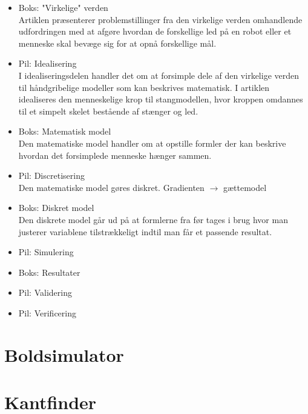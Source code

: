\documentclass{article}
\begin{document}
\begin{itemize}
	\item Boks: "Virkelige" verden \\
	Artiklen præsenterer problemstillinger fra den virkelige verden omhandlende udfordringen med at afgøre hvordan de forskellige led på en robot eller et menneske skal bevæge sig for at opnå forskellige mål.
	\item Pil: Idealisering \\
	I idealiseringsdelen handler det om at forsimple dele af den virkelige verden til håndgribelige modeller som kan beskrives matematisk. I artiklen idealiseres den menneskelige krop til stangmodellen, hvor kroppen omdannes til et simpelt skelet bestående af stænger og led.
	\item Boks: Matematisk model \\
	Den matematiske model handler om at opstille formler der kan beskrive hvordan det forsimplede menneske hænger sammen.
	\item Pil: Discretisering \\
	Den matematiske model gøres diskret. Gradienten $\rightarrow$ gættemodel%
	\item Boks: Diskret model \\
	Den diskrete model går ud på at formlerne fra før tages i brug hvor man justerer variablene tilstrækkeligt indtil man får et passende resultat. %
	\item Pil: Simulering \\
	
	\item Boks: Resultater \\
	
	\item Pil: Validering \\
	
	\item Pil: Verificering \\
	
\end{itemize}

\section{Boldsimulator}

\section{Kantfinder}
\end{document}
